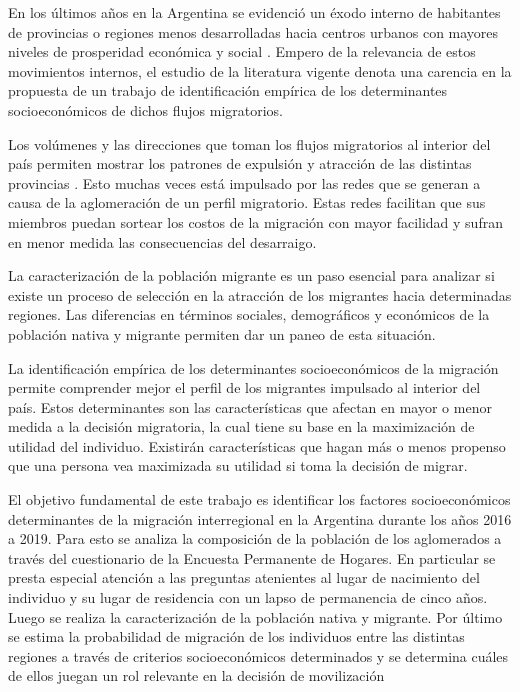 \documentclass[12pt,a4paper]{article}
\begin{document}
En los últimos años en la Argentina se evidenció un éxodo interno de habitantes de provincias o regiones menos desarrolladas hacia centros urbanos con mayores niveles de prosperidad económica y social \parencite{ferrero_patrones_2020}. Empero de la relevancia de estos movimientos internos, el estudio de la literatura vigente denota una carencia en la propuesta de un trabajo de identificación empírica de los determinantes socioeconómicos de dichos flujos migratorios.

Los volúmenes y las direcciones que toman los flujos migratorios al interior del país permiten mostrar los patrones de expulsión y atracción de las distintas provincias \parencite{ferrero_patrones_2020}. Esto muchas veces está impulsado por las redes que se generan a causa de la aglomeración de un perfil migratorio. Estas redes facilitan que sus miembros puedan sortear los costos de la migración con mayor facilidad y sufran en menor medida las consecuencias del desarraigo.

La caracterización de la población migrante es un paso esencial para analizar si existe un proceso de selección en la atracción de los migrantes hacia determinadas regiones. Las diferencias en términos sociales, demográficos y económicos de la población nativa y migrante permiten dar un paneo de esta situación.

La identificación empírica de los determinantes socioeconómicos de la migración permite comprender mejor el perfil de los migrantes impulsado al interior del país. Estos determinantes son las características que afectan en mayor o menor medida a la decisión migratoria, la cual tiene su base en la maximización de utilidad del individuo. Existirán características que hagan más o menos propenso que una persona vea maximizada su utilidad si toma la decisión de migrar.

El objetivo fundamental de este trabajo es identificar los factores socioeconómicos determinantes de la migración interregional en la Argentina durante los años 2016 a 2019. Para esto se analiza la composición de la población de los aglomerados a través del cuestionario de la Encuesta Permanente de Hogares. En particular se presta especial atención a las preguntas atenientes al lugar de nacimiento del individuo y su lugar de residencia con un lapso de permanencia de cinco años. Luego se realiza la caracterización de la población nativa y migrante. Por último se estima la probabilidad de migración de los individuos entre las distintas regiones a través de criterios socioeconómicos determinados y se determina cuáles de ellos juegan un rol relevante en la decisión de movilización
\end{document}
